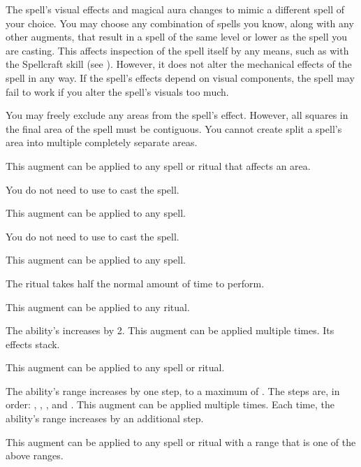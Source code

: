              The spell's visual effects and magical aura changes to mimic a different spell of your choice.
            You may choose any combination of spells you know, along with any other augments, that result in a spell of the same level or lower as the spell you are casting.
            This affects inspection of the spell itself by any means, such as with the Spellcraft skill (see ).
            However, it does not alter the mechanical effects of the spell in any way.
            If the spell's effects depend on visual components, the spell may fail to work if you alter the spell's visuals too much. 

             You may freely exclude any areas from the spell's effect.
            However, all squares in the final area of the spell must be contiguous.
            You cannot create split a spell's area into multiple completely separate areas.
            \par This augment can be applied to any spell or ritual that affects an area.

             You do not need to use  to cast the spell.
            \par This augment can be applied to any spell.

             You do not need to use  to cast the spell.
            \par This augment can be applied to any spell.

             The ritual takes half the normal amount of time to perform.
            \par This augment can be applied to any ritual.

             The ability's  increases by 2.
            This augment can be applied multiple times.
            Its effects stack.
            \par This augment can be applied to any spell or ritual.

             The ability's range increases by one step, to a maximum of \rngext.
            The steps are, in order: \rngclose, \rngmed, \rnglong, and \rngext.
            This augment can be applied multiple times.
            Each time, the ability's range increases by an additional step.
            \par This augment can be applied to any spell or ritual with a range that is one of the above ranges.

